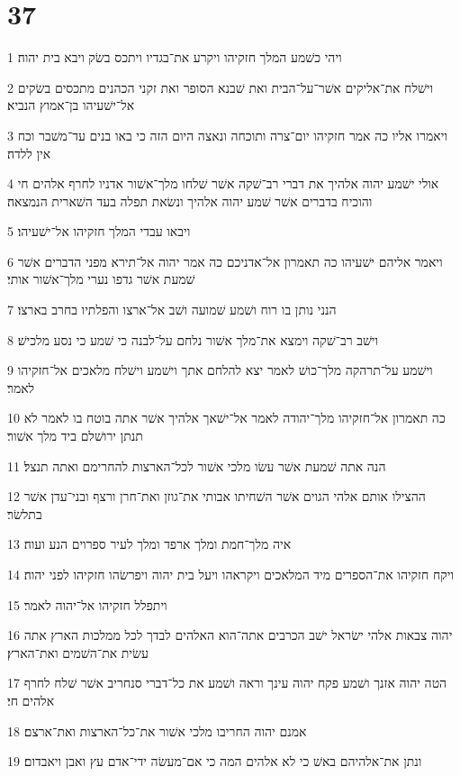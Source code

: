 \chapter{37}

\par 1 ויהי כשׁמע המלך חזקיהו ויקרע את־בגדיו ויתכס בשׂק ויבא בית יהוה׃
\par 2 וישׁלח את־אליקים אשׁר־על־הבית ואת שׁבנא הסופר ואת זקני הכהנים מתכסים בשׂקים אל־ישׁעיהו בן־אמוץ הנביא׃
\par 3 ויאמרו אליו כה אמר חזקיהו יום־צרה ותוכחה ונאצה היום הזה כי באו בנים עד־משׁבר וכח אין ללדה׃
\par 4 אולי ישׁמע יהוה אלהיך את דברי רב־שׁקה אשׁר שׁלחו מלך־אשׁור אדניו לחרף אלהים חי והוכיח בדברים אשׁר שׁמע יהוה אלהיך ונשׂאת תפלה בעד השׁארית הנמצאה׃
\par 5 ויבאו עבדי המלך חזקיהו אל־ישׁעיהו׃
\par 6 ויאמר אליהם ישׁעיהו כה תאמרון אל־אדניכם כה אמר יהוה אל־תירא מפני הדברים אשׁר שׁמעת אשׁר גדפו נערי מלך־אשׁור אותי׃
\par 7 הנני נותן בו רוח ושׁמע שׁמועה ושׁב אל־ארצו והפלתיו בחרב בארצו׃
\par 8 וישׁב רב־שׁקה וימצא את־מלך אשׁור נלחם על־לבנה כי שׁמע כי נסע מלכישׁ׃
\par 9 וישׁמע על־תרהקה מלך־כושׁ לאמר יצא להלחם אתך וישׁמע וישׁלח מלאכים אל־חזקיהו לאמר׃
\par 10 כה תאמרון אל־חזקיהו מלך־יהודה לאמר אל־ישׁאך אלהיך אשׁר אתה בוטח בו לאמר לא תנתן ירושׁלם ביד מלך אשׁור׃
\par 11 הנה אתה שׁמעת אשׁר עשׂו מלכי אשׁור לכל־הארצות להחרימם ואתה תנצל׃
\par 12 ההצילו אותם אלהי הגוים אשׁר השׁחיתו אבותי את־גוזן ואת־חרן ורצף ובני־עדן אשׁר בתלשׂר׃
\par 13 איה מלך־חמת ומלך ארפד ומלך לעיר ספרוים הנע ועוה׃
\par 14 ויקח חזקיהו את־הספרים מיד המלאכים ויקראהו ויעל בית יהוה ויפרשׂהו חזקיהו לפני יהוה׃
\par 15 ויתפלל חזקיהו אל־יהוה לאמר׃
\par 16 יהוה צבאות אלהי ישׂראל ישׁב הכרבים אתה־הוא האלהים לבדך לכל ממלכות הארץ אתה עשׂית את־השׁמים ואת־הארץ׃
\par 17 הטה יהוה אזנך ושׁמע פקח יהוה עינך וראה ושׁמע את כל־דברי סנחריב אשׁר שׁלח לחרף אלהים חי׃
\par 18 אמנם יהוה החריבו מלכי אשׁור את־כל־הארצות ואת־ארצם׃
\par 19 ונתן את־אלהיהם באשׁ כי לא אלהים המה כי אם־מעשׂה ידי־אדם עץ ואבן ויאבדום׃

